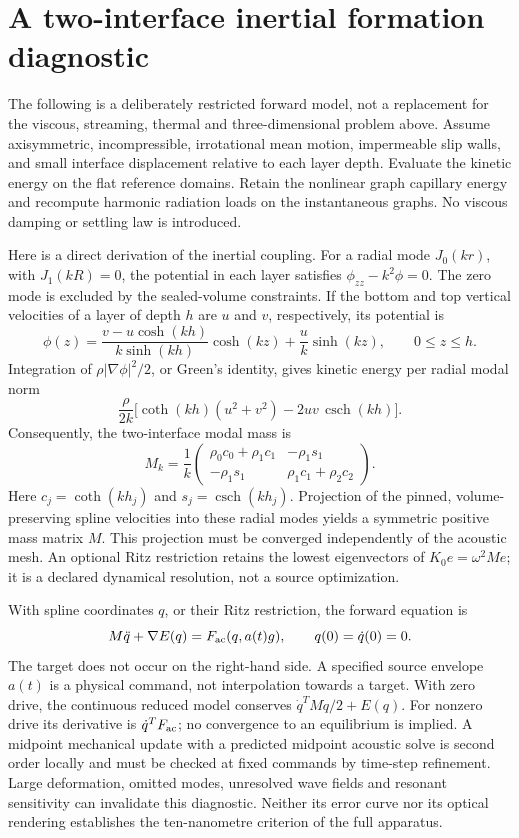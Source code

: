 \section{A two-interface inertial formation diagnostic}
\label{sec:reduced-formation}
The following is a deliberately restricted forward model, not a replacement
for the viscous, streaming, thermal and three-dimensional problem above.
Assume axisymmetric, incompressible, irrotational mean motion, impermeable
slip walls, and small interface displacement relative to each layer depth.
Evaluate the kinetic energy on the flat reference domains. Retain the
nonlinear graph capillary energy and recompute harmonic radiation loads on
the instantaneous graphs. No viscous damping or settling law is introduced.

Here is a direct derivation of the inertial coupling. For a radial mode
$J_0(kr)$, with $J_1(kR)=0$, the potential in each layer satisfies
$\phi_{zz}-k^2\phi=0$. The zero mode is excluded by the sealed-volume
constraints. If the bottom and top vertical velocities of a layer of depth
$h$ are $u$ and $v$, respectively, its potential is
\[
 \phi(z)=\frac{v-u\cosh(kh)}{k\sinh(kh)}\cosh(kz)
             +\frac{u}{k}\sinh(kz),\qquad 0\le z\le h.
\]
Integration of $\rho|\nabla\phi|^2/2$, or Green's identity, gives kinetic
energy per radial modal norm
\[
 \frac{\rho}{2k}\bigl[\coth(kh)(u^2+v^2)-2uv\,\operatorname{csch}(kh)\bigr].
\]
Consequently, the two-interface modal mass is
\[
 M_k=\frac1k\begin{pmatrix}
 \rho_0 c_0+\rho_1 c_1&-\rho_1 s_1\\
 -\rho_1 s_1&\rho_1 c_1+\rho_2 c_2
 \end{pmatrix}.
\]
Here $c_j=\coth(kh_j)$ and $s_j=\operatorname{csch}(kh_j)$.
Projection of the pinned, volume-preserving spline velocities into these
radial modes yields a symmetric positive mass matrix $M$. This projection
must be converged independently of the acoustic mesh. An optional Ritz
restriction retains the lowest eigenvectors of $K_0 e=\omega^2 M e$;
it is a declared dynamical resolution, not a source optimization.

With spline coordinates $q$, or their Ritz restriction, the forward equation is
\[
 M\ddot q+\nabla E(q)=F_{\rm ac}(q,a(t)g),\qquad q(0)=\dot q(0)=0.
\]
The target does not occur on the right-hand side. A specified source envelope
$a(t)$ is a physical command, not interpolation towards a target. With
zero drive, the continuous reduced model conserves $\dot q^TM\dot q/2+E(q)$.
For nonzero drive its derivative is $\dot q^T F_{\rm ac}$; no convergence
to an equilibrium is implied. A midpoint mechanical update with a predicted
midpoint acoustic solve is second order locally and must be checked at
fixed commands by time-step refinement. Large deformation, omitted modes,
unresolved wave fields and resonant sensitivity can invalidate this diagnostic.
Neither its error curve nor its optical rendering establishes the ten-nanometre
criterion of the full apparatus.
